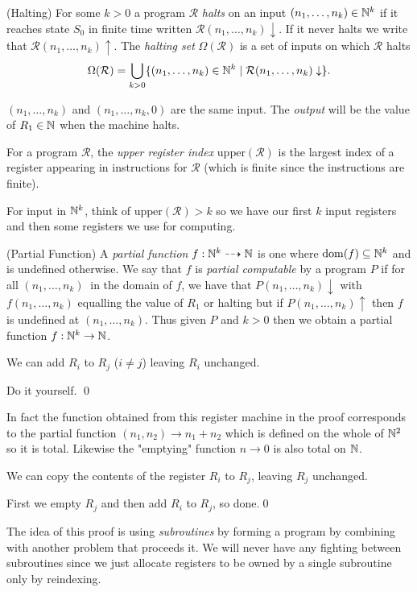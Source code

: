 \documentclass[tikx, border = 10pt]{article}
\begin{document}
\begin{definition}
	(Halting) For some $ k>0 $ a program $ \mathcal R $ \textit{halts} on an input $ (n_1,\dots, n_k) \in \mathbb{N}^k $ if it reaches state $ S_0 $ in finite time written $ \mathcal R(n_1,\dots, n_k)\downarrow $. If it never halts we write that $ \mathcal R(n_1,\dots, n_k)\uparrow $. The \textit{halting set} $ \Omega(\mathcal R) $ is a set of inputs on which $ \mathcal R $ halts
	\[
		\Omega(\mathcal R) =\bigcup_{k>0} \{(n_1,\dots, n_k)\in \mathbb{N}^k\mid \mathcal R(n_1,\dots, n_k)\downarrow\}.
	\]
\end{definition}
\begin{remark}
	$ (n_1,\dots, n_k) $ and $ (n_1,\dots, n_k,0) $ are the same input. The \textit{output} will be the value of $ R_1\in\mathbb{N} $ when the machine halts.
\end{remark}
\begin{definition}
 	For a program $ \mathcal R $, the \textit{upper register index}  $ \mathrm{upper}(\mathcal R) $ is the largest index of a register appearing in instructions for $ \mathcal R $ (which is finite since the instructions are finite).
\end{definition}
For input in $ \mathbb{N}^k $, think of $ \mathrm{upper}(\mathcal R)>k $ so we have our first $ k $ input registers and then some registers we use for computing.
\begin{definition}
	(Partial Function) A \textit{partial function} $ f: \mathbb{N}^k \dashrightarrow \mathbb{N} $ is one where $ \mathrm{dom}(f) \subseteq \mathbb{N}^k $ and is undefined otherwise. We say that $ f $ is \textit{partial computable} by a program $ P $ if for all $ (n_1,\dots, n_k)\ $ in the domain of $ f $, we have that $ P(n_1,\dots, n_k)\downarrow $ with $ f(n_1,\dots, n_k) $ equalling the value of $ R_1 $ or halting but if $ P(n_1,\dots, n_k)\uparrow $ then $ f $ is undefined at $ (n_1,\dots, n_k) $. Thus given $ P $ and $ k>0 $ then we obtain a partial function $ f:\mathbb{N}^k \to \mathbb{N} $.
\end{definition}
\begin{lemma}
  We can add $ R_i $ to $ R_j $ ($ i\ne j $) leaving $ R_i $ unchanged.
\end{lemma}
\pf Do it yourself. \qed
\par
In fact the function obtained from this register machine in the proof corresponds to the partial function $ (n_1,n_2) \to n_1 + n_2 $ which is defined on the whole of $ \mathbb{N}^2 $ so it is total. Likewise the "emptying" function $ n \to 0 $ is also total on $ \mathbb{N} $.
\begin{corollary}
  We can copy the contents of the register $ R_i $ to $ R_j $, leaving $ R_j $ unchanged.
\end{corollary}
\pf First we empty $ R_j $ and then add $ R_i $ to $ R_j $, so done.\qed
\begin{remark}
	The idea of this proof is using \textit{subroutines} by forming a program by combining with another problem that proceeds it. We will never have any fighting between subroutines since we just allocate registers to be owned by a single subroutine only by reindexing.
\end{remark}
\end{document}

